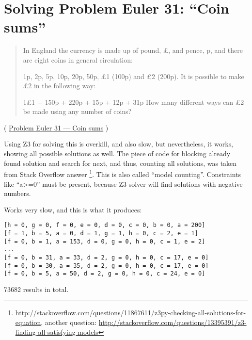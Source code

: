 \section{Solving Problem Euler 31: ``Coin sums''}

\begin{framed}
\begin{quotation}
In England the currency is made up of pound, £, and pence, p, and there are eight coins in general circulation:

1p, 2p, 5p, 10p, 20p, 50p, £1 (100p) and £2 (200p).
It is possible to make £2 in the following way:

1£1 + 150p + 220p + 15p + 12p + 31p
How many different ways can £2 be made using any number of coins?
\end{quotation}
\end{framed}
( \href{http://projecteuler.net/problem=31}{Problem Euler 31 --- Coin sums} )

\label{SMTEnumerate}
Using Z3 for solving this is overkill, and also slow, but nevertheless, it works, showing all possible solutions as well.
The piece of code for blocking already found solution and search for next, and thus, counting all solutions, was taken from Stack Overflow answer
\footnote{\url{http://stackoverflow.com/questions/11867611/z3py-checking-all-solutions-for-equation}, 
another question: \url{http://stackoverflow.com/questions/13395391/z3-finding-all-satisfying-models}}.
This is also called ``model counting''.
Constraints like ``a>=0'' must be present, because Z3 solver will find solutions with negative numbers.



Works very slow, and this is what it produces:

\begin{lstlisting}
[h = 0, g = 0, f = 0, e = 0, d = 0, c = 0, b = 0, a = 200]
[f = 1, b = 5, a = 0, d = 1, g = 1, h = 0, c = 2, e = 1]
[f = 0, b = 1, a = 153, d = 0, g = 0, h = 0, c = 1, e = 2]
...
[f = 0, b = 31, a = 33, d = 2, g = 0, h = 0, c = 17, e = 0]
[f = 0, b = 30, a = 35, d = 2, g = 0, h = 0, c = 17, e = 0]
[f = 0, b = 5, a = 50, d = 2, g = 0, h = 0, c = 24, e = 0]
\end{lstlisting}

73682 results in total.
